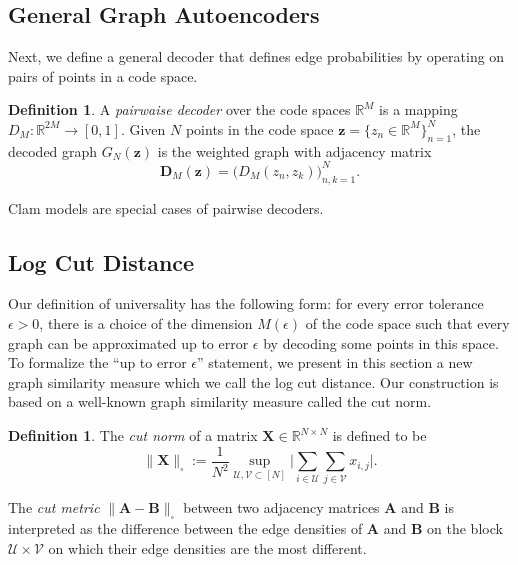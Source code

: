 \documentclass{article}
\theoremstyle{plain}
\theoremstyle{definition}
\newtheorem{definition}[theorem]{Definition}
\theoremstyle{remark}
\begin{document}
\subsection{General Graph Autoencoders}

Next, we define a general decoder that defines edge probabilities  by operating on pairs of points in a code space. 

\begin{definition}
   A \emph{pairwaise decoder} over the code spaces $\mathbb{R}^M$ is a mapping $D_M:\mathbb{R}^{2M}\rightarrow[0,1]$. Given $N$ points in the code space $\mathbf{z}=\{z_n\in\mathbb{R}^M\}_{n=1}^N$, the decoded graph $G_N(\mathbf{z})$ is the weighted graph with adjacency matrix  
\[\mathbf{D}_M(\mathbf{z})=\big(D_M(z_n,z_k)\big)_{n,k=1}^N.\]
\end{definition}

Clam models are special cases of pairwise decoders.


\subsection{Log Cut Distance}

Our definition of universality has the following form: for every error tolerance $\epsilon>0$, there is a choice of the dimension $M(\epsilon)$ of the code space such that every graph can be approximated up to error $\epsilon$ by decoding some points in this space. To formalize the ``up to error $\epsilon$'' statement, we present in this section a new graph similarity measure which we call the log cut distance.
Our construction is based on a well-known graph similarity measure called the cut norm.

\begin{definition}
  The \emph{cut norm} of a matrix $\mathbf{X}\in\mathbb{R}^{N\times N}$ is defined to be
    \begin{equation}
    \label{eq:GraphCutNorm0}  \|\mathbf{X}\|_{\square}:=\frac{1}{N^2}\sup_{\mathcal{U},\mathcal{V}\subset[N]}\Big|\sum_{i\in \mathcal{U}}\sum_{j\in \mathcal{V}}x_{i,j}\Big|.
\end{equation}  
\end{definition}
The \emph{cut metric} $\|\mathbf{A}-\mathbf{B} \|_{\square}$ between two adjacency matrices $\mathbf{A}$ and $\mathbf{B}$ is interpreted as the difference between the edge densities of $\mathbf{A}$ and $\mathbf{B}$ on the block $\mathcal{U}\times\mathcal{V}$ on which their edge densities are the most different.
\end{document}
